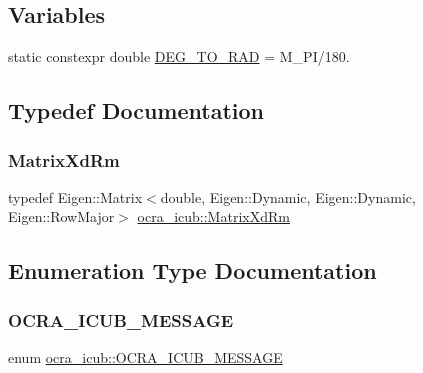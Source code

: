 \subsection*{Variables}
\begin{DoxyCompactItemize}
\item 
static constexpr double \hyperlink{namespaceocra__icub_ab06477ded34ed5514b911a3511b22e3d}{D\+E\+G\+\_\+\+T\+O\+\_\+\+R\+AD} = M\+\_\+\+PI/180.
\end{DoxyCompactItemize}


\subsection{Typedef Documentation}
\hypertarget{namespaceocra__icub_aa5e36a19ed031c28ca83c207bd7dd83f}{}\label{namespaceocra__icub_aa5e36a19ed031c28ca83c207bd7dd83f} 
\subsubsection{\texorpdfstring{Matrix\+Xd\+Rm}{MatrixXdRm}}
{\footnotesize\ttfamily typedef Eigen\+::\+Matrix$<$double, Eigen\+::\+Dynamic, Eigen\+::\+Dynamic, Eigen\+::\+Row\+Major$>$ \hyperlink{namespaceocra__icub_aa5e36a19ed031c28ca83c207bd7dd83f}{ocra\+\_\+icub\+::\+Matrix\+Xd\+Rm}}



\subsection{Enumeration Type Documentation}
\hypertarget{namespaceocra__icub_afbd2db66b68005fb7cfac19210caf83f}{}\label{namespaceocra__icub_afbd2db66b68005fb7cfac19210caf83f} 
\subsubsection{\texorpdfstring{O\+C\+R\+A\+\_\+\+I\+C\+U\+B\+\_\+\+M\+E\+S\+S\+A\+GE}{OCRA\_ICUB\_MESSAGE}}
{\footnotesize\ttfamily enum \hyperlink{namespaceocra__icub_afbd2db66b68005fb7cfac19210caf83f}{ocra\+\_\+icub\+::\+O\+C\+R\+A\+\_\+\+I\+C\+U\+B\+\_\+\+M\+E\+S\+S\+A\+GE}}

